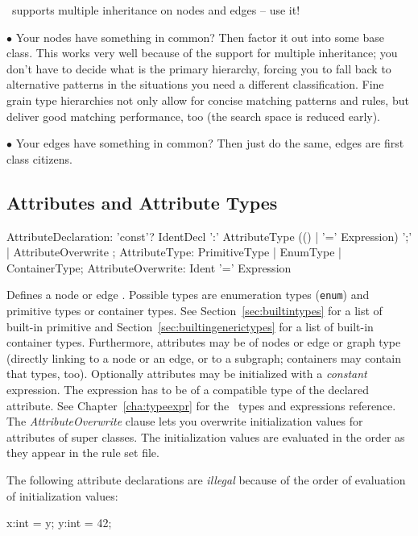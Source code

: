 \begin{note}
\GrG~supports multiple inheritance on nodes and edges -- use it!

$\bullet$ Your nodes have something in common?
Then factor it out into some base class.
This works very well because of the support for multiple inheritance; you don't have to decide what is the primary hierarchy, forcing you to fall back to alternative patterns in the situations you need a different classification.
Fine grain type hierarchies not only allow for concise matching patterns and rules,
but deliver good matching performance, too (the search space is reduced early).

$\bullet$ Your edges have something in common?
Then just do the same, edges are first class citizens.
\end{note}

\subsection{Attributes and Attribute Types}
\label{sct:attrtypes}

\begin{rail}
  AttributeDeclaration: 'const'? IdentDecl ':' AttributeType (() | '=' Expression) ';' | AttributeOverwrite ;
  AttributeType: PrimitiveType | EnumType | ContainerType;
  AttributeOverwrite: Ident '=' Expression
\end{rail}
Defines a node or edge .
Possible types are enumeration types (\texttt{enum}) and primitive types or container types.
See Section~\ref{sec:builtintypes} for a list of built-in primitive and Section~\ref{sec:builtingenerictypes} for a list of built-in container types.
Furthermore, attributes may be of nodes or edge or graph type (directly linking to a node or an edge, or to a subgraph; containers may contain that types, too).
Optionally attributes may be initialized with a \emph{constant} expression.
The expression has to be of a compatible type of the declared attribute.
See Chapter~\ref{cha:typeexpr} for the \GrG\ types and expressions reference.
The \emph{AttributeOverwrite} clause lets you overwrite initialization values for attributes of super classes.
The initialization values are evaluated in the order as they appear in the rule set file.
\begin{warning}
	The following attribute declarations are \emph{illegal} because of the order of evaluation of initialization values:
	\begin{grgen}
x:int = y;
y:int = 42;
	\end{grgen}
\end{warning}

